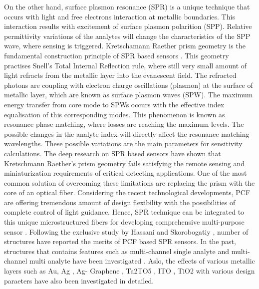 \documentclass[10pt]{IEEEtran}
\begin{document}
On the other hand, surface plasmon resonance (SPR) is a unique technique that occurs with light and free electrons interaction at metallic boundaries. This interaction results with excitement of surface plasmon polarition (SPP). Relative permittivity variations of the analytes will change the characteristics of the SPP wave, where sensing is triggered. Kretschamann Raether prism geometry is the fundamental construction principle of SPR based sensors \cite{kretschmann1968radiative}. This geometry practises Snell's Total Internal Reflection rule, where still very small amount of light refracts from the metallic layer into the evanescent field.  The refracted photons are coupling with electron charge oscillations (plasmon) at the surface of metallic layer, which are known as surface plasmon waves (SPW). The maximum energy transfer from core mode to SPWs occurs with the effective index equalisation of this corresponding modes. This phenomenon is known as resonance phase matching, where losses are reaching the maximum levels. The possible changes in the analyte index will directly affect the resonance matching wavelengths. These possible variations are the main parameters for sensitivity calculations. The deep research on SPR based sensors have shown that Kretschmann Raether’s prism geometry fails satisfying the remote sensing and miniaturization requirements of critical detecting applications. One of the most common solution of overcoming these limitations are replacing the prism with the core of an optical fiber. Considering the recent technological developments, PCF are offering tremendous amount of design flexibility with the possibilities of complete control of light guidance. Hence, SPR technique can be integrated to this unique microstructured fibers for developing comprehensive multi-purpose sensor \cite{rifat2016highly,yasli2019effect}. Following the exclusive study by Hassani and Skorobogatiy \cite{hassani2006design}, number of structures have reported the merits of PCF based SPR sensors. In the past, structures that contains features such as multi-channel single analyte and multi-channel multi analyte have been investigated \cite{rifat2016highly,yasli2019effect,zhang2011wagon,yasli2019multi,azzam2016multichannel}. Aslo, the effects of various metallic layers such as Au, Ag \cite{yasli2019multi}, Ag- Graphene \cite{rifat2016highly}, Ta2TO5 \cite{otupiri2015multi}, ITO \cite{dash2014spr}, TiO2 \cite{rifat2016highly} with various design paraeters have also been investigated in detailed.
\end{document}
